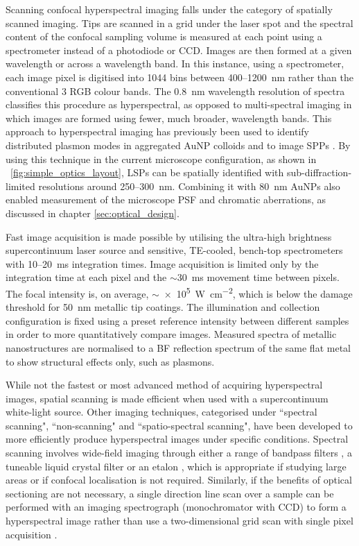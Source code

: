 \documentclass{article}
\begin{document}
Scanning confocal hyperspectral imaging falls under the category of spatially scanned imaging. Tips are scanned in a grid under the laser spot and the spectral content of the confocal sampling volume is measured at each point using a spectrometer instead of a photodiode or CCD. Images are then formed at a given wavelength or across a wavelength band. In this instance, using a spectrometer, each image pixel is digitised into 1044 bins between 400--\SI{1200}{nm} rather than the conventional 3 RGB colour bands. The \SI{0.8}{nm} wavelength resolution of spectra classifies this procedure as hyperspectral, as opposed to multi-spectral imaging in which images are formed using fewer, much broader, wavelength bands. %
This approach to hyperspectral imaging has previously been used to identify distributed plasmon modes in aggregated AuNP colloids \cite{herrmann2013} and to image SPPs \cite{bashevoy2007hyperspectral}. By using this technique in the current microscope configuration, as shown in \figurename~\ref{fig:simple_optics_layout}, LSPs can be spatially identified with sub-diffraction-limited resolutions around 250--\SI{300}{nm}. Combining it with \SI{80}{nm} AuNPs also enabled measurement of the microscope PSF and chromatic aberrations, as discussed in chapter \ref{sec:optical_design}.

Fast image acquisition is made possible by utilising the ultra-high brightness supercontinuum laser source and sensitive, TE-cooled, bench-top spectrometers with 10--\SI{20}{ms} integration times. Image acquisition is limited only by the integration time at each pixel and the $\sim$\SI{30}{ms} movement time between pixels. The focal intensity is, on average, $\sim$\SI{e5}{\watt\per\centi\metre\squared}, which is below the damage threshold for \SI{50}{nm} metallic tip coatings. The illumination and collection configuration is fixed using a preset reference intensity between different samples in order to more quantitatively compare images. Measured spectra of metallic nanostructures are normalised to a BF reflection spectrum of the same flat metal to show structural effects only, such as plasmons. %

While not the fastest or most advanced method of acquiring hyperspectral images, spatial scanning is made efficient when used with a supercontinuum white-light source. Other imaging techniques, categorised under ``spectral scanning", ``non-scanning" and ``spatio-spectral scanning", have been developed to more efficiently produce hyperspectral images under specific conditions.
Spectral scanning involves wide-field imaging through either a range of bandpass filters \cite{iga2012development}, a tuneable liquid crystal filter \cite{slawson1999hyperspectral, gat2000imaging} or an etalon \cite{daly2000tunable}, which is appropriate if studying large areas or if confocal localisation is not required. Similarly, if the benefits of optical sectioning are not necessary, a single direction line scan over a sample can be performed with an imaging spectrograph (monochromator with CCD) to form a hyperspectral image rather than use a two-dimensional grid scan with single pixel acquisition \cite{schultz2001hyperspectral}.
\end{document}

